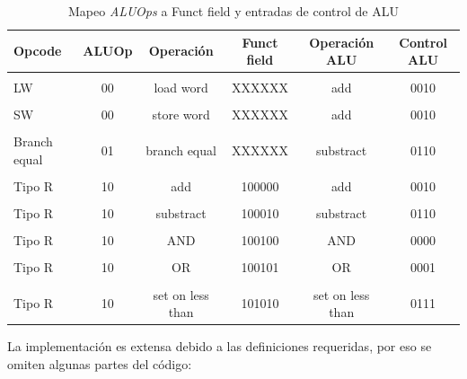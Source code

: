\documentclass[12pt]{article}
\begin{document}
\begin{table}[!ht]
\centering
\caption{Mapeo \textit{ALUOps} a Funct field y entradas de control de ALU}
\label{tab:alucontrolops}
\smallskip
\begin{tabular}{l c c c c c}
\hline
Opcode & ALUOp & Operación & Funct field & Operación ALU & Control ALU\\[0.5ex]
\hline
&&\\[-2ex]
LW & 00 & load word & XXXXXX & add & 0010\\[0.5ex]
\hline
&&\\[-2ex]
SW & 00 & store word & XXXXXX & add & 0010\\[0.5ex]
\hline
&&\\[-2ex]
Branch equal & 01 & branch equal & XXXXXX & substract & 0110\\[0.5ex]
\hline
&&\\[-2ex]
Tipo R & 10 & add & 100000 & add & 0010\\[0.5ex]
\hline
&&\\[-2ex]
Tipo R & 10 & substract & 100010 & substract & 0110\\[0.5ex]
\hline
&&\\[-2ex]
Tipo R & 10 & AND & 100100 & AND & 0000\\[0.5ex]
\hline
&&\\[-2ex]
Tipo R & 10 & OR & 100101 & OR & 0001\\[0.5ex]
\hline
&&\\[-2ex]
Tipo R & 10 & set on less than & 101010 & set on less than & 0111\\[0.5ex]
\hline
\end{tabular}
\end{table}

La implementación es extensa debido a las definiciones requeridas, por eso se omiten algunas partes del código:
\end{document}
